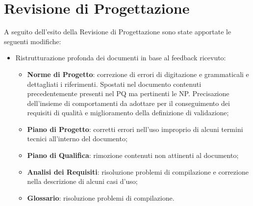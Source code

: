 \documentclass[openany,12pt,a4paper]{report}
\begin{document}
\section{Revisione di Progettazione}

A seguito dell'esito della Revisione di Progettazione sono state apportate le seguenti modifiche:

\begin{itemize}
	\item Ristrutturazione profonda dei documenti in base al feedback ricevuto:
	\begin{itemize}
		\item \textbf{Norme di Progetto}: correzione di errori di digitazione e grammaticali e dettagliati i riferimenti. Spostati nel documento contenuti precedentemente presenti nel PQ ma pertinenti le NP. Precisazione dell'insieme di comportamenti da adottare per il conseguimento dei requisiti di qualità e miglioramento della definizione di validazione;
		\item \textbf{Piano di Progetto}: corretti errori nell'uso improprio di alcuni termini tecnici all'interno del documento;
		\item \textbf{Piano di Qualifica}: rimozione contenuti non attinenti al documento;
		\item \textbf{Analisi dei Requisiti}: risoluzione problemi di compilazione e correzione nella descrizione di alcuni casi d'uso;
		\item \textbf{Glossario}: risoluzione problemi di compilazione.
	\end{itemize}
\end{itemize}
\end{document}
